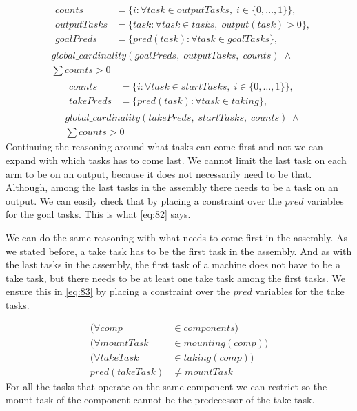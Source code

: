   \begin{equation}
  \begin{aligned}\label{eq:82}
  &\begin{aligned}
  counts &= \{i : \forall task \in outputTasks, \; i \in \{0 , \ldots , 1\}\}, \\
  outputTasks &= \{task : \forall task \in tasks, \; output(task) > 0\}, \\
  goalPreds &= \{pred(task) : \forall task \in goalTasks\},
  \end{aligned} \\
  &global\_cardinality(goalPreds, \; outputTasks, \; counts) \; \land\\
  &\sum counts > 0
  \end{aligned}
  \end{equation}
   \begin{equation}
   \begin{aligned}\label{eq:83}
   &\begin{aligned}
   counts &= \{i : \forall task \in startTasks, \; i \in \{0 , \ldots , 1\}\}, \\
   takePreds &= \{pred(task) : \forall task \in taking\}, 
   \end{aligned}\\
   &global\_cardinality(takePreds, \; startTasks, \; counts) \; \land\\
   &\sum counts > 0
   \end{aligned}
   \end{equation}
 Continuing the reasoning around what tasks can come first and not we can expand with which tasks has to come last. We cannot limit the last task on each arm to be on an output, because it does not necessarily need to be that. Although, among the last tasks in the assembly there needs to be a task on an output. We can easily check that by placing a constraint over the $pred$ variables for the goal tasks. This is what \ref{eq:82} says.
 
 We can do the same reasoning with what needs to come first in the assembly. As we stated before, a take task has to be the first task in the assembly. And as with the last tasks in the assembly, the first task of a machine does not have to be a take task, but there needs to be at least one take task among the first tasks. We ensure this in \ref{eq:83} by placing a constraint over the $pred$ variables for the take tasks.
  
   \begin{equation}
  \begin{aligned}\label{eq:85}
  (\forall comp &\in components) \\
  (\forall mountTask &\in mounting(comp)) \\
  (\forall takeTask &\in taking(comp)) \\
  pred(takeTask) &\neq mountTask
  \end{aligned}
  \end{equation}
  For all the tasks that operate on the same component we can restrict so the mount task of the component cannot be the predecessor of the take task. 
  
